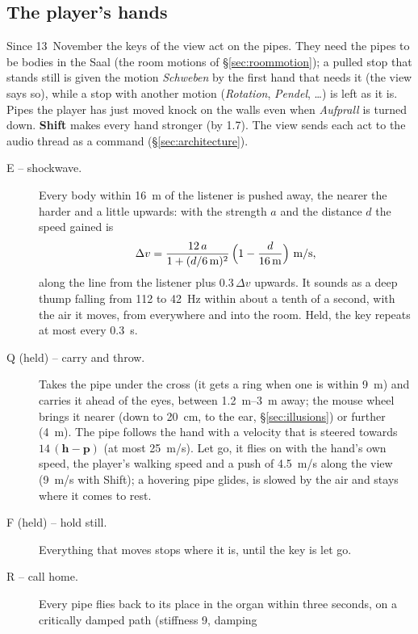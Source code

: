 \documentclass[11pt,a4paper,parskip=half,DIV=11,toc=bibliography]{scrartcl}
\newcommand{\ui}[1]{\emph{#1}}                 %
\begin{document}
\subsection{The player's hands}
\label{sec:hands}
Since 13~November the keys of the view act on the pipes. They need the pipes to be bodies in the Saal (the room motions of
\S\ref{sec:roommotion}); a pulled stop that stands still is given the motion \ui{Schweben} by the first hand that needs it (the view says so),
while a stop with another motion (\ui{Rotation}, \ui{Pendel}, \dots) is left as it is. Pipes the player has just moved knock on the walls even when
\ui{Aufprall} is turned down. \textbf{Shift} makes every hand stronger (by 1.7). The view sends each act to the audio thread as a command
(\S\ref{sec:architecture}).
\begin{description}
  \item[E -- shockwave.] Every body within \SI{16}{m} of the listener is pushed away, the nearer the harder and a little upwards:
        with the strength $a$ and the distance $d$ the speed gained is
        \begin{equation}
          \Delta v = \frac{12\,a}{1+(d/\SI{6}{m})^2}\,\Bigl(1-\frac{d}{\SI{16}{m}}\Bigr)\ \text{m/s},
        \end{equation}
        along the line from the listener plus $0.3\,\Delta v$ upwards. It sounds as a deep thump falling from 112 to \SI{42}{Hz} within about a
        tenth of a second, with the air it moves, from everywhere and into the room. Held, the key repeats at most every \SI{0.3}{s}.
  \item[Q (held) -- carry and throw.] Takes the pipe under the cross (it gets a ring when one is within \SI{9}{m}) and carries it ahead of the
        eyes, between \SIrange{1.2}{3}{m} away; the mouse wheel brings it nearer (down to \SI{20}{cm}, to the ear, \S\ref{sec:illusions}) or further
        (\SI{4}{m}). The pipe follows the hand with a velocity that is steered towards $14\,(\mathbf h-\mathbf p)$ (at most \SI{25}{m/s}). Let go,
        it flies on with the hand's own speed, the player's walking speed and a push of \SI{4.5}{m/s} along the view (\SI{9}{m/s} with Shift);
        a hovering pipe glides, is slowed by the air and stays where it comes to rest.
  \item[F (held) -- hold still.] Everything that moves stops where it is, until the key is let go.
  \item[R -- call home.] Every pipe flies back to its place in the organ within three seconds, on a critically damped path (stiffness 9, damping

\end{description}
\end{document}
